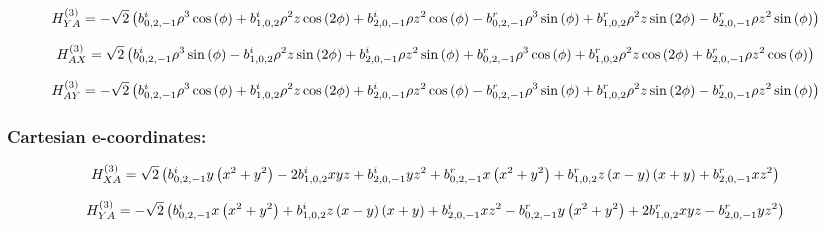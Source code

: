 \documentclass[fleqn]{article}
\begin{document}
\begin{dmath*}
H_{YA}^{(3)}=-  \sqrt{2} \left( b^{i}_{0,2,-1} \rho^{3} \cos{\left (\phi \right )} +  b^{i}_{1,0,2} \rho^{2} z \cos{\left (2 \phi \right )} +  b^{i}_{2,0,-1} \rho z^{2} \cos{\left (\phi \right )} -  b^{r}_{0,2,-1} \rho^{3} \sin{\left (\phi \right )} +  b^{r}_{1,0,2} \rho^{2} z \sin{\left (2 \phi \right )} -  b^{r}_{2,0,-1} \rho z^{2} \sin{\left (\phi \right )}\right)\\
\end{dmath*}

\begin{dmath*}
H_{AX}^{(3)}=\sqrt{2} \left(b^{i}_{0,2,-1} \rho^{3} \sin{\left (\phi \right )} - b^{i}_{1,0,2} \rho^{2} z \sin{\left (2 \phi \right )} + b^{i}_{2,0,-1} \rho z^{2} \sin{\left (\phi \right )} + b^{r}_{0,2,-1} \rho^{3} \cos{\left (\phi \right )} + b^{r}_{1,0,2} \rho^{2} z \cos{\left (2 \phi \right )} + b^{r}_{2,0,-1} \rho z^{2} \cos{\left (\phi \right )}\right)\\
\end{dmath*}

\begin{dmath*}
H_{AY}^{(3)}=-  \sqrt{2} \left( b^{i}_{0,2,-1} \rho^{3} \cos{\left (\phi \right )} +  b^{i}_{1,0,2} \rho^{2} z \cos{\left (2 \phi \right )} +  b^{i}_{2,0,-1} \rho z^{2} \cos{\left (\phi \right )} -  b^{r}_{0,2,-1} \rho^{3} \sin{\left (\phi \right )} +  b^{r}_{1,0,2} \rho^{2} z \sin{\left (2 \phi \right )} -  b^{r}_{2,0,-1} \rho z^{2} \sin{\left (\phi \right )}\right)\\
\end{dmath*}
\subsubsection*{Cartesian e-coordinates:}

\begin{dmath*}
H_{XA}^{(3)}=\sqrt{2} \left(b^{i}_{0,2,-1} y \left(x^{2} + y^{2}\right) - 2 b^{i}_{1,0,2} x y z + b^{i}_{2,0,-1} y z^{2} + b^{r}_{0,2,-1} x \left(x^{2} + y^{2}\right) + b^{r}_{1,0,2} z \left(x - y\right) \left(x + y\right) + b^{r}_{2,0,-1} x z^{2}\right)\\
\end{dmath*}

\begin{dmath*}
H_{YA}^{(3)}=-  \sqrt{2} \left( b^{i}_{0,2,-1} x \left(x^{2} + y^{2}\right) +  b^{i}_{1,0,2} z \left(x - y\right) \left(x + y\right) +  b^{i}_{2,0,-1} x z^{2} -  b^{r}_{0,2,-1} y \left(x^{2} + y^{2}\right) + 2 b^{r}_{1,0,2} x y z -  b^{r}_{2,0,-1} y z^{2}\right)\\
\end{dmath*}
\end{document}
